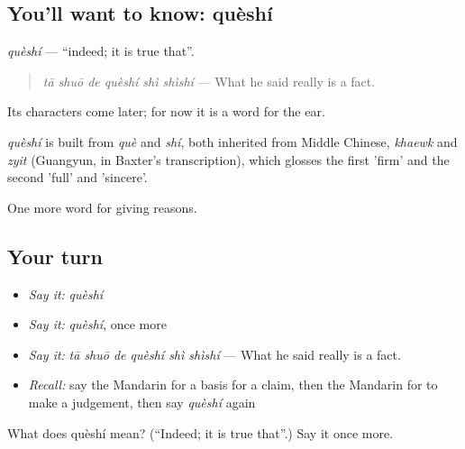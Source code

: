 \subsection*{You'll want to know: quèshí}
\emph{quèshí} — \textquotedblleft{}indeed; it is true that\textquotedblright{}.

\begin{quote}
\emph{tā shuō de quèshí shì shìshí} — What he said really is a fact.
\end{quote}

Its characters come later; for now it is a word for the ear.

\begin{cousinweb}
\emph{quèshí} is built from \emph{què} and \emph{shí}, both inherited from Middle Chinese, \emph{khaewk} and \emph{zyit} (Guangyun, in Baxter's transcription), which glosses the first 'firm' and the second 'full' and 'sincere'.
\end{cousinweb}

\begin{grammarlens}[title={What you've built}]
One more word for giving reasons.
\end{grammarlens}

\subsection*{Your turn}
\begin{itemize}
\raggedright
  \item \emph{Say it:} \emph{quèshí}
  \item \emph{Say it:} \emph{quèshí}, once more
  \item \emph{Say it:} \emph{tā shuō de quèshí shì shìshí} — What he said really is a fact.
  \item \emph{Recall:} say the Mandarin for a basis for a claim, then the Mandarin for to make a judgement, then say \emph{quèshí} again
\end{itemize}

\begin{tcolorbox}[breakable,colback=teal!4,colframe=teal!35!black,title={Before you move on}]
What does quèshí mean? (\textquotedblleft{}Indeed; it is true that\textquotedblright{}.) Say it once more.
\end{tcolorbox}
